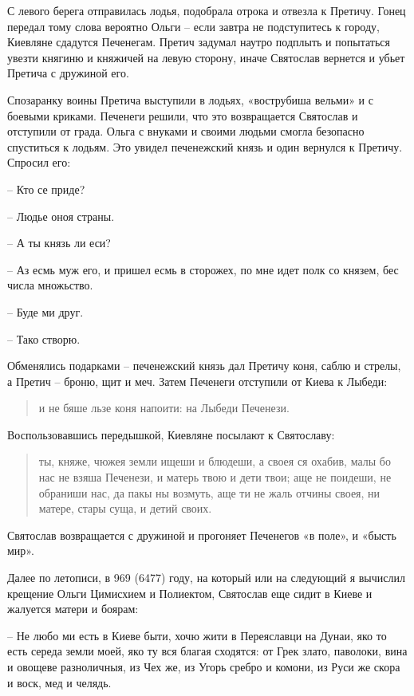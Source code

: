 С левого берега отправилась лодья, подобрала отрока и отвезла к Претичу. Гонец передал тому слова вероятно Ольги – если завтра не подступитесь к городу, Киевляне сдадутся Печенегам. Претич задумал наутро подплыть и попытаться увезти княгиню и княжичей на левую сторону, иначе Святослав вернется и убьет Претича с дружиной его.

Спозаранку воины Претича выступили в лодьях, «вострубиша вельми» и с боевыми криками. Печенеги решили, что это возвращается Святослав и отступили от града. Ольга с внуками и своими людьми смогла безопасно спуститься к лодьям. Это увидел печенежский князь и один вернулся к Претичу. Спросил его:

 – Кто се приде?

 – Людье оноя страны.

 – А ты князь ли еси?

 – Аз есмь муж его, и пришел есмь в сторожех, по мне идет полк со князем, бес числа множьство.

 – Буде ми друг.

 – Тако створю.

Обменялись подарками – печенежский князь дал Претичу коня, саблю и стрелы, а Претич – броню, щит и меч. Затем Печенеги отступили от Киева к Лыбеди:

\begin{quotation}
и не бяше льзе коня напоити: на Лыбеди Печенези.
\end{quotation}

Воспользовавшись передышкой, Киевляне посылают к Святославу:

\begin{quotation}
ты, княже, чюжея земли ищеши и блюдеши, а своея ся охабив, малы бо нас не взяша Печенези, и матерь твою и дети твои; аще не поидеши, не обраниши нас, да пакы ны возмуть, аще ти не жаль отчины своея, ни матере, стары суща, и детий своих.
\end{quotation}

Святослав возвращается с дружиной и прогоняет Печенегов «в поле», и «бысть мир».

Далее по летописи, в 969 (6477) году, на который или на следующий я вычислил крещение Ольги Цимисхием и Полиектом, Святослав еще сидит в Киеве и жалуется матери и боярам:

 – Не любо ми есть в Киеве быти, хочю жити в Переяславци на Дунаи, яко то есть середа земли моей, яко ту вся благая сходятся: от Грек злато, паволоки, вина и овощеве разноличныя, из Чех же, из Угорь сребро и комони, из Руси же скора и воск, мед и челядь.

